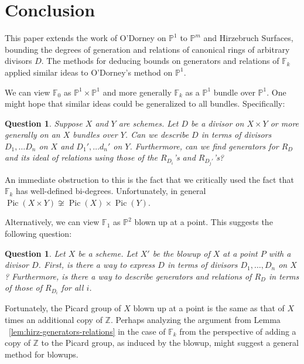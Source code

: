 \documentclass{amsart}
\theoremstyle{plain}
\newtheorem{question}[thm]{Question}
\theoremstyle{definition}
\theoremstyle{remark}
\numberwithin{equation}{section}
\newcommand\bp{{\mathbb P}}
\newcommand\bz{{\mathbb Z}}
\newcommand\hirz{\mathbb{F}}
\DeclareMathOperator{\Pic}{Pic}
\begin{document}

\section{Conclusion}
This paper extends the work of O'Dorney on $\bp^1$ to $\bp^m$ and Hirzebruch Surfaces, bounding the degrees of generation and relations of canonical rings of arbitrary divisors $D$.  The methods for deducing bounds on generators and relations of $\hirz_k$ applied similar ideas to O'Dorney's method on $\bp^1$.  

We can view $\hirz_0$ as $\bp^1\times \bp^1$ and more generally $\hirz_k$ as a $\bp^1$ bundle over $\bp^1$.  One might hope that similar ideas could be generalized to all bundles.  Specifically:
\begin{question}
\label{qn:general-product-bundle}
Suppose $X$ and $Y$ are schemes.  Let $D$ be a divisor on $X\times Y$ or more generally on an $X$ bundles over $Y$.  Can we describe $D$ in terms of divisors $D_1, \ldots D_n$ on $X$ and $D_1', \ldots d_n'$ on $Y$.  Furthermore, can we find generators for $R_D$ and its ideal of relations using those of the $R_{D_i}$'s and $R_{D_j'}$'s?
\end{question}

An immediate obstruction to this is the fact that we critically used the fact that $\hirz_k$ has well-defined bi-degrees.  Unfortunately, in general $\Pic(X \times Y) \not \cong \Pic(X) \times \Pic(Y)$.

Alternatively, we can view $\hirz_1$ as $\bp^2$ blown up at a point.  This suggests the following question:
\begin{question}
\label{qn:general-blowup}
Let $X$ be a scheme.  Let $X'$ be the blowup of $X$ at a point $P$ with a divisor $D$.  First, is there a way to express $D$ in terms of divisors $D_1, \ldots, D_n$ on $X$?  Furthermore, is there a way to describe generators and relations of $R_D$ in terms of those of $R_{D_i}$ for all $i$.
\end{question}

Fortunately, the Picard group of $X$ blown up at a point is the same as that of $X$ times an additional copy of $\bz$.  Perhaps analyzing the argument from Lemma ~\ref{lem:hirz-generators-relations}  in the case of $\hirz_k$ from the perspective of adding a copy of $\mathbb{Z}$ to the Picard group, as induced by the blowup, might suggest a general method for blowups.
\end{document}
